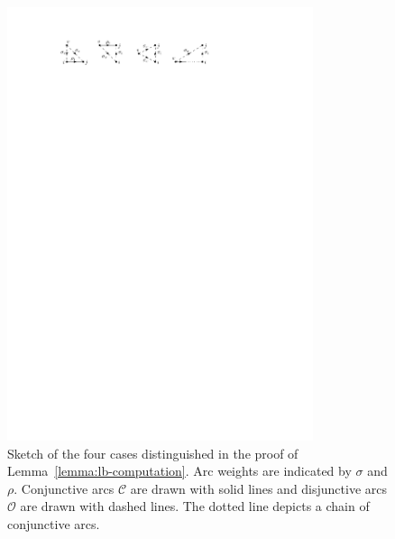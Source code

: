 \documentclass[a4paper]{report}
\theoremstyle{definition}
\theoremstyle{plain}
\begin{document}
\begin{figure}
  \centering
  \includegraphics[width=0.8\textwidth]{figures/single/lower-bound-lemma.pdf}
  \caption{Sketch of the four cases distinguished in the proof of Lemma~\ref{lemma:lb-computation}. Arc
    weights are indicated by $\sigma$ and $\rho$. Conjunctive arcs $\mathcal{C}$ are
    drawn with solid lines and disjunctive arcs $\mathcal{O}$ are drawn with
    dashed lines. The dotted line depicts a chain of conjunctive arcs.}\label{fig:lb-computation}
\end{figure}
\end{document}
